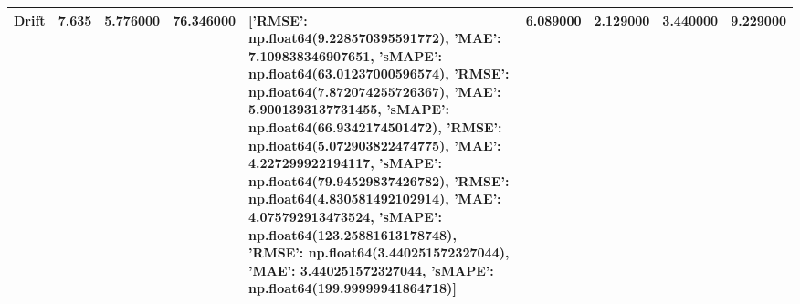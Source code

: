 \begin{tabular}{llrrlrrrr}
Drift & \textbf{7.635} & 5.776000 & 76.346000 & [{'RMSE': np.float64(9.228570395591772), 'MAE': 7.109838346907651, 'sMAPE': np.float64(63.01237000596574)}, {'RMSE': np.float64(7.872074255726367), 'MAE': 5.9001393137731455, 'sMAPE': np.float64(66.9342174501472)}, {'RMSE': np.float64(5.072903822474775), 'MAE': 4.227299922194117, 'sMAPE': np.float64(79.94529837426782)}, {'RMSE': np.float64(4.830581492102914), 'MAE': 4.075792913473524, 'sMAPE': np.float64(123.25881613178748)}, {'RMSE': np.float64(3.440251572327044), 'MAE': 3.440251572327044, 'sMAPE': np.float64(199.99999941864718)}] & 6.089000 & 2.129000 & 3.440000 & 9.229000 \\
\bottomrule
\end{tabular}
